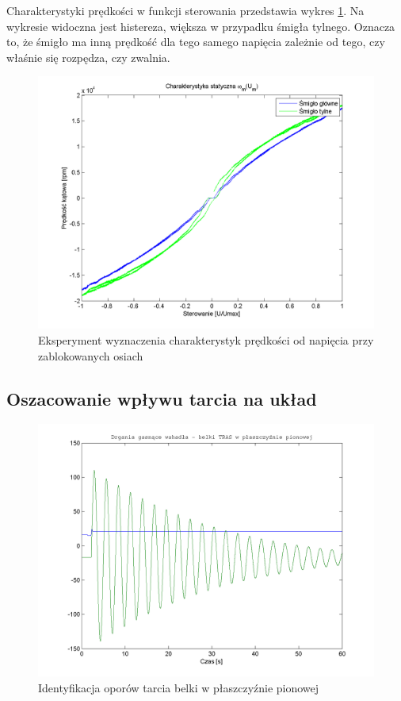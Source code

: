Charakterystyki prędkości w funkcji sterowania przedstawia wykres \ref{rys:char_omega}. 
Na wykresie widoczna jest histereza, większa w przypadku śmigła tylnego. Oznacza to, że śmigło ma inną prędkość dla tego samego napięcia zależnie od tego, czy właśnie się rozpędza, czy zwalnia.

\begin{figure}[!htb]
\centering
\includegraphics[scale=0.85]{img/char_stat_omega.png}
\caption{Eksperyment wyznaczenia charakterystyk prędkości od napięcia przy zablokowanych osiach}
\label{rys:char_omega}
\end{figure}

\subsection{Oszacowanie wpływu tarcia na układ}

\begin{figure}[!htb]
\centering
\includegraphics[scale=0.85]{img/gasnace.png}
\caption{Identyfikacja oporów tarcia belki w płaszczyźnie pionowej}
\label{rys:gasnace}
\end{figure}


